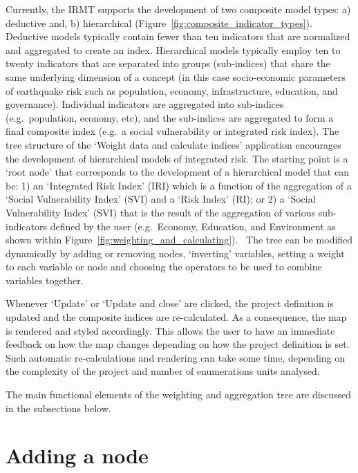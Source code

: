Currently, the IRMT supports the development of two composite model types: a)
deductive and, b) hierarchical (Figure~\ref{fig:composite_indicator_types}).
Deductive models typically contain fewer than ten indicators that are
normalized and aggregated to create an index. Hierarchical models typically
employ ten to twenty indicators that are separated into groups (sub-indices)
that share the same underlying dimension of a concept (in this case
socio-economic parameters of earthquake risk such as population, economy,
infrastructure, education, and governance).  Individual indicators are
aggregated into sub-indices (e.g.\ population, economy, etc), and the
sub-indices are aggregated to form a final composite index (e.g.\ a social
vulnerability or integrated risk index). The tree structure of the `Weight data
and calculate indices' application encourages the development of hierarchical
models of integrated risk. The starting point is a `root node' that corresponds
to the development of a hierarchical model that can be: 1) an `Integrated Risk
Index' (IRI) which is a function of the aggregation of a `Social Vulnerability
Index' (SVI) and a `Risk Index' (RI); or 2) a `Social Vulnerability Index'
(SVI) that is the result of the aggregation of various sub-indicators defined
by the user (e.g.\ Economy, Education, and Environment as shown within
Figure~\ref{fig:weighting_and_calculating}).  The tree can be modified
dynamically by adding or removing nodes, `inverting' variables, setting a
weight to each variable or node and choosing the operators to be used to
combine variables together.

Whenever `Update' or `Update and close' are clicked, the project definition is
updated and the composite indices are re-calculated. As a consequence, the map
is rendered and styled accordingly. This allows the user to have an immediate
feedback on how the map changes depending on how the project definition is set.
Such automatic re-calculations and rendering can take some time, depending on
the complexity of the project and number of enumerations units analysed.

The main functional elements of the weighting and aggregation tree are
discussed in the subsections below.


\section{Adding a node}

